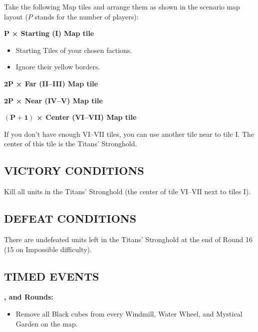 \begin{multicols*}{2}
Take the following Map tiles and arrange them as shown in the scenario map layout ($P$ stands for the number of players):

$\boldsymbol{P}$ \textbf{× Starting (I) Map tile}
\begin{itemize}
  \item Starting Tiles of your chosen factions.
  \item Ignore their yellow borders.
\end{itemize}

$\boldsymbol{2 P}$ \textbf{× Far (II--III) Map tile}

$\boldsymbol{2 P}$ \textbf{× Near (IV--V) Map tile}

$\boldsymbol{(P + 1)}$ \textbf{× Center (VI--VII) Map tile}

If you don't have enough VI--VII tiles, you can use another tile near to tile I.
The center of this tile is the Titans' Stronghold.

\subsection*{\MakeUppercase{Victory Conditions}}

Kill all units in the Titans' Stronghold (the center of tile VI--VII next to tiles I).

\subsection*{\MakeUppercase{Defeat Conditions}}

There are undefeated units left in the Titans' Stronghold at the end of Round 16 (15 on Impossible difficulty).

\subsection*{\MakeUppercase{Timed Events}}

\textbf{,  and  Rounds:}
\begin{itemize}
  \item Remove all Black cubes from every Windmill, Water Wheel, and Mystical Garden on the map.
\end{itemize}

\vspace*{\fill}\columnbreak


\end{multicols*}
